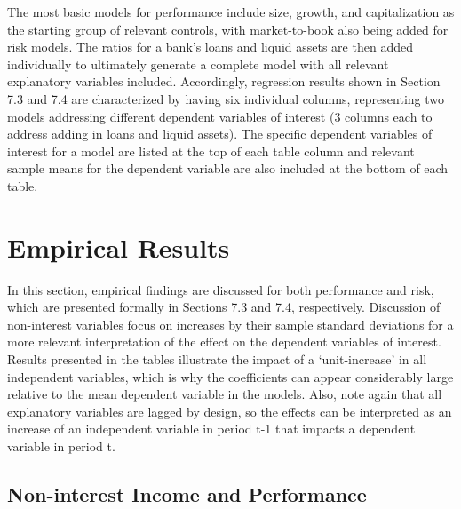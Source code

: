 \documentclass[10pt]{article} %
\begin{document}
\par The most basic models for performance include size, growth, and capitalization as the starting group of relevant controls, with market-to-book also being added for risk models. The ratios for a bank's loans and liquid assets are then added individually to ultimately generate a complete model with all relevant explanatory variables included. Accordingly, regression results shown in Section 7.3 and 7.4 are characterized by having six individual columns, representing two models addressing different dependent variables of interest (3 columns each to address adding in loans and liquid assets). The specific dependent variables of interest for a model are listed at the top of each table column and relevant sample means for the dependent variable are also included at the bottom of each table.

\section{Empirical Results}

In this section, empirical findings are discussed for both performance and risk, which are presented formally in Sections 7.3 and 7.4, respectively. Discussion of non-interest variables focus on increases by their sample standard deviations for a more relevant interpretation of the effect on the dependent variables of interest. Results presented in the tables illustrate the impact of a `unit-increase' in all independent variables, which is why the coefficients can appear considerably large relative to the mean dependent variable in the models. Also, note again that all explanatory variables are lagged by design, so the effects can be interpreted as an increase of an independent variable in period t-1 that impacts a dependent variable in period t.

\subsection{Non-interest Income and Performance}
\end{document}
